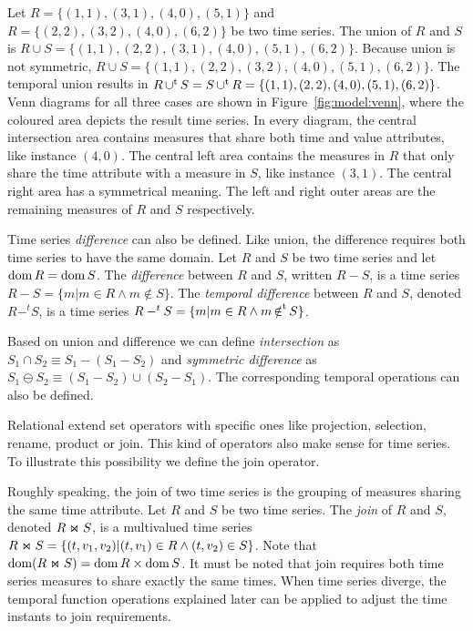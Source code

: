 \begin{example}\label{ex:model:s1s2}
  Let $R=\{(1,1), (3,1), (4,0), (5,1)\}$ and $R=\{(2,2), (3,2), (4,0),
  (6,2)\}$ be two time series. The union of $R$ and $S$ is $R\cup
  S=\{(1,1), (2,2), (3,1), (4,0), (5,1), (6,2)\}$. Because union is
  not symmetric, $R\cup S=\{(1,1), (2,2), \allowbreak(3,2), (4, 0), (5,1),
  (6,2)\}$. The temporal union results in $R\operatorname*{\cup^t} S= S \operatorname*{\cup^t}
  R=\{(1,1), (2,2), (4,0), (5,1), (6,2)\}$.  
  Venn diagrams for all three cases are shown in
  Figure~\ref{fig:model:venn}, where the coloured area depicts the
  result time series. In every diagram, the central intersection area
  contains measures that share both time and value attributes, like
  instance $(4,0)$. The central left area contains the measures in $R$
  that only share the time attribute with a measure in $S$, like
  instance $(3,1)$. The central right area has a symmetrical
  meaning. The left and right outer areas are the remaining measures
  of $R$ and $S$ respectively.
\end{example}




Time series \emph{difference} can also be defined. Like union, the
difference requires both time series to have the same domain.
%
Let $R$ and $S$ be two time series and let $\operatorname{dom} R = \operatorname{dom} S$.
%
The \emph{difference} between $R$ and $S$, written $R-S$, is a time
series $R-S=\{m|m\in R\wedge m\notin S\}$.
%
The \emph{temporal difference} between $R$ and $S$, denoted $R-^t S$, 
is a time series $R-^tS=\{m|m\in R\wedge m \operatorname*{\notin^t} S\}$.


Based on union and difference we can define \emph{intersection} as
$S_1\cap S_2 \equiv S_1 - (S_1 - S_2)$ and \emph{symmetric difference}
as $S_1 \ominus S_2 \equiv (S_1 - S_2) \cup (S_2 - S_1)$. The
corresponding temporal operations can also be defined.

Relational  extend set operators with specific ones like
projection, selection, rename, product or join. This kind of operators
also make sense for time series. To illustrate this possibility we
define the join operator.

Roughly speaking, the join of two time series is the grouping of
measures sharing the same time attribute.  Let $R$ and $S$ be two time
series.  The \emph{join} of $R$ and $S$, denoted $R \Join S$, is a
multivalued time series $R \Join S = \{ (t,v_1,v_2) | (t,v_1) \in
R\wedge (t,v_2) \in S\}$. Note that $\operatorname{dom}(R\Join
S)=\operatorname{dom} R\times\operatorname{dom} S$.
%
It must be noted that join requires both time series measures to share
exactly the same times. When time series diverge, the temporal
function operations explained later can be applied to adjust the time
instants to join requirements.


